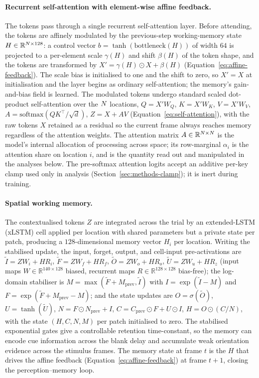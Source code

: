 \paragraph{Recurrent self-attention with element-wise affine feedback.}
The tokens pass through a single recurrent self-attention layer. Before
attending, the tokens are affinely modulated by the previous-step
working-memory state $H \in \mathbb{R}^{N \times 128}$: a control
vector $b = \tanh(\mathrm{bottleneck}(H))$ of width $64$ is projected to a
per-element scale $\gamma(H)$ and shift $\beta(H)$ of the token shape, and
the tokens are transformed by $X' = \gamma(H) \odot X + \beta(H)$
(Equation~\ref{eq:affine-feedback}). The scale bias is initialised to one
and the shift to zero, so $X' = X$ at initialisation and the layer begins
as ordinary self-attention; the memory's gain-and-bias field is learned.
The modulated tokens undergo standard scaled dot-product self-attention
over the $N$ locations, $Q = X'W_Q$, $K = X'W_K$, $V = X'W_V$,
$A = \mathrm{softmax}(QK^{\top}/\sqrt{d})$, $Z = X + AV$
(Equation~\ref{eq:self-attention}), with the raw tokens $X$ retained as a
residual so the current frame always reaches memory regardless of the
attention weights. The attention matrix $A \in \mathbb{R}^{N \times
N}$ is the model's internal allocation of processing across space; its
row-marginal $\alpha_i$ is the attention share on location $i$, and is the
quantity read out and manipulated in the analyses below. The pre-softmax
attention logits accept an additive per-key clamp used only in analysis
(Section~\ref{sec:methods-clamp}); it is inert during training.

\paragraph{Spatial working memory.}
The contextualised tokens $Z$ are integrated across the trial by an
extended-LSTM (xLSTM) cell applied per location with shared parameters but
a private state per patch, producing a $128$-dimensional memory vector
$H_i$ per location. Writing the stabilised update, the input, forget,
output, and cell-input pre-activations are $\tilde{I} = ZW_i + HR_i$,
$\tilde{F} = ZW_f + HR_f$, $\tilde{O} = ZW_o + HR_o$, $\tilde{U} = ZW_u +
HR_z$ (input maps $W \in \mathbb{R}^{140\times128}$ biased, recurrent maps
$R \in \mathbb{R}^{128\times128}$ bias-free); the log-domain stabiliser is
$M = \max(\tilde{F} + M_{\mathrm{prev}}, \tilde{I})$ with
$I = \exp(\tilde{I} - M)$ and $F = \exp(\tilde{F} + M_{\mathrm{prev}} -
M)$; and the state updates are $O = \sigma(\tilde{O})$, $U =
\tanh(\tilde{U})$, $N = F \odot N_{\mathrm{prev}} + I$, $C =
C_{\mathrm{prev}} \odot F + U \odot I$, $H = O \odot (C / N)$, with the
state $(H, C, N, M)$ per patch initialised to zero. The stabilised
exponential gates give a controllable retention time-constant, so the
memory can encode cue information across the blank
delay and accumulate weak orientation evidence across the stimulus
frames. The memory state at frame $t$ is the $H$ that drives the affine
feedback (Equation~\ref{eq:affine-feedback}) at frame $t+1$, closing the
perception--memory loop.

